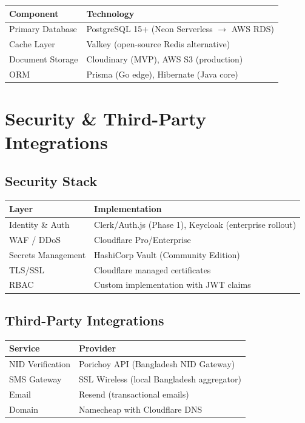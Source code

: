 \documentclass[11pt,a4paper]{article}
\begin{document}
\begin{tabular}{@{}p{4cm}p{9cm}@{}}
\toprule
\textbf{Component} & \textbf{Technology} \\
\midrule
Primary Database & PostgreSQL 15+ (Neon Serverless $\rightarrow$ AWS RDS) \\
Cache Layer & Valkey (open-source Redis alternative) \\
Document Storage & Cloudinary (MVP), AWS S3 (production) \\
ORM & Prisma (Go edge), Hibernate (Java core) \\
\bottomrule
\end{tabular}

\section{Security \& Third-Party Integrations}

\subsection{Security Stack}

\begin{tabular}{@{}p{4cm}p{9cm}@{}}
\toprule
\textbf{Layer} & \textbf{Implementation} \\
\midrule
Identity \& Auth & Clerk/Auth.js (Phase 1), Keycloak (enterprise rollout) \\
WAF / DDoS & Cloudflare Pro/Enterprise \\
Secrets Management & HashiCorp Vault (Community Edition) \\
TLS/SSL & Cloudflare managed certificates \\
RBAC & Custom implementation with JWT claims \\
\bottomrule
\end{tabular}

\subsection{Third-Party Integrations}

\begin{tabular}{@{}p{4cm}p{9cm}@{}}
\toprule
\textbf{Service} & \textbf{Provider} \\
\midrule
NID Verification & Porichoy API (Bangladesh NID Gateway) \\
SMS Gateway & SSL Wireless (local Bangladesh aggregator) \\
Email & Resend (transactional emails) \\
Domain & Namecheap with Cloudflare DNS \\
\bottomrule
\end{tabular}
\end{document}
